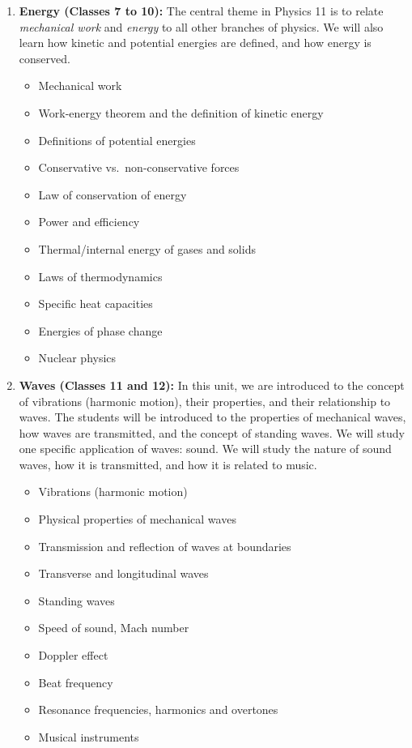 \documentclass{../oss-handout}
\begin{document}
\begin{enumerate}[itemsep=.05ex,label={\textbf{\arabic*.}}]
\item\textbf{Energy (Classes 7 to 10):} The central theme in Physics 11 is to
  relate \emph{mechanical work} and \emph{energy} to all other branches of
  physics. We will also learn how kinetic and potential energies are defined,
  and how energy is conserved.
  \begin{itemize}[nosep]
  \item Mechanical work
  \item Work-energy theorem and the definition of kinetic energy
  \item Definitions of potential energies
  \item Conservative vs.\ non-conservative forces
  \item Law of conservation of energy
  \item Power and efficiency
  \item Thermal/internal energy of gases and solids
  \item Laws of thermodynamics %
  \item Specific heat capacities
  \item Energies of phase change
  \item Nuclear physics
  \end{itemize}

\item\textbf{Waves (Classes 11 and 12):} In this unit, we are introduced to the
  concept of vibrations (harmonic motion), their properties, and their
  relationship to waves. The students will be introduced to the properties of
  mechanical waves, how waves are transmitted, and the concept of standing
  waves. We will study one specific application of waves: sound. We will study
  the nature of sound waves, how it is transmitted, and how it is related to
  music.
  \begin{itemize}[nosep]
  \item Vibrations (harmonic motion)
  \item Physical properties of mechanical waves
  \item Transmission and reflection of waves at boundaries
  \item Transverse and longitudinal waves
  \item Standing waves
  \item Speed of sound, Mach number
  \item Doppler effect
  \item Beat frequency
  \item Resonance frequencies, harmonics and overtones
  \item Musical instruments
  \end{itemize}
  

\end{enumerate}
\end{document}
